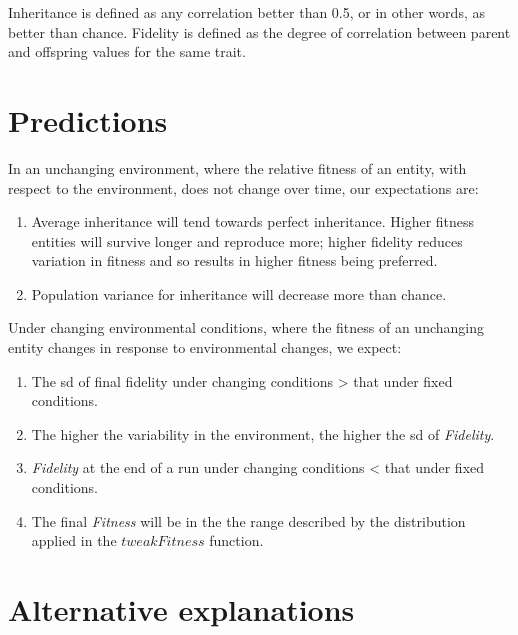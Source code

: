 Inheritance is defined as any correlation better than 0.5, or in other words, as better than chance. Fidelity is defined as the degree of correlation between parent and offspring values for the same trait.


\section{Predictions}\label{predictions}

In an unchanging environment, where the relative fitness of an entity, with respect to the environment, does not change over time, our expectations are:

\begin{enumerate}
	\item Average inheritance will tend towards perfect inheritance.
 Higher fitness entities will survive longer and reproduce more; higher fidelity reduces variation in fitness and so results in higher fitness being preferred.
	\item Population variance for inheritance will decrease more than chance.
\end{enumerate}

Under changing environmental conditions, where the fitness of an unchanging entity changes in response to environmental changes, we expect:

\begin{enumerate}
	\item The \gls{sd} of final fidelity under changing conditions \textgreater{} that under fixed conditions.
	\item The higher the variability in the environment, the higher the \gls{sd} of \emph{Fidelity}.
	\item \emph{Fidelity} at the end of a run under changing conditions \textless{} that under fixed conditions.
	\item The final \emph{Fitness} will be in the the range described by the distribution applied in the $tweakFitness$ function.
\end{enumerate}

\section{Alternative explanations}\label{alternative-explanations-1}

